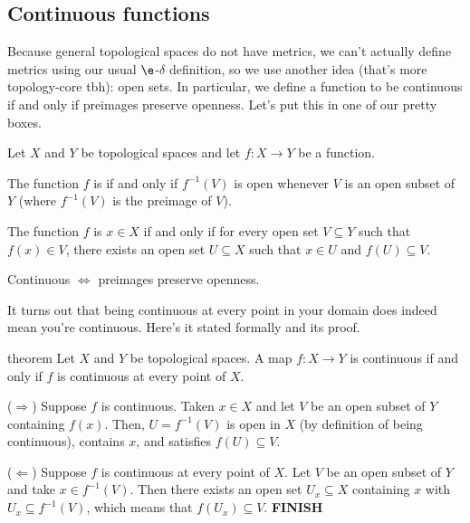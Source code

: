 \documentclass[class=article, crop=false]{standalone}
\begin{document}
\subsection{Continuous functions}

Because general topological spaces do not have metrics, we can't actually define metrics using our usual $\e$-$\delta$ definition, so we use another idea (that's more topology-core tbh): open sets. In particular, we define a function to be continuous if and only if preimages preserve openness. Let's put this in one of our pretty boxes.
\begin{defn}[Continuity]
  Let $X$ and $Y$ be topological spaces and let $f \colon X \to Y$ be a function.

  The function $f$ is  if and only if $f^{-1}(V)$ is open whenever $V$ is an open subset of $Y$ (where $f^{-1}(V)$ is the preimage of $V$).

  The function $f$ is  $x \in X$ if and only if for every open set $V \subseteq Y$ such that $f(x) \in V$, there exists an open set $U \subseteq X$ such that $x \in U$ and $f(U) \subseteq V$.
\end{defn}

\begin{slogan}
  Continuous $\iff$ preimages preserve openness.
\end{slogan}

It turns out that being continuous at every point in your domain does indeed mean you're continuous. Here's it stated formally and its proof.

\begin{result}{theorem}
  Let $X$ and $Y$ be topological spaces. A map $f \colon X \to Y$ is continuous if and only if $f$ is continuous at every point of $X$.
\end{result}
\begin{pf}
  ($\Rightarrow$) Suppose $f$ is continuous. Taken $x \in X$ and let $V$ be an open subset of $Y$ containing $f(x)$. Then, $U = f^{-1}(V)$ is open in $X$ (by definition of being continuous), contains $x$, and satisfies $f(U) \subseteq V$.

  ($\Leftarrow$) Suppose $f$ is continuous at every point of $X$. Let $V$ be an open subset of $Y$ and take $x \in f^{-1}(V)$. Then there exists an open set $U_x \subseteq X$ containing $x$ with $U_x \subseteq f^{-1}(V)$, which means that $f(U_x) \subseteq V$. \textbf{FINISH}
\end{pf}
\end{document}
